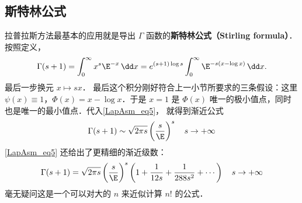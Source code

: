 \subsection{斯特林公式}
拉普拉斯方法最基本的应用就是导出 $\Gamma$ 函数的\textbf{斯特林公式（Stirling formula）}． 按照定义，
\[
  \Gamma(s+1)
  =\int_0^\infty x^s\E^{-x}\,\dd x
  =e^{(s+1)\log s}\int_0^\infty \E^{-s(x-\log x)}\,\dd x.
\]
最后一步换元 $x\mapsto sx$． 最后这个积分刚好符合上一小节所要求的三条假设：这里 $\psi(x)\equiv1$，$\Phi(x)=x-\log x$．于是 $x=1$ 是 $\Phi(x)$ 唯一的极小值点，同时也是唯一的最小值点．代入\autoref{LapAsm_eq5}， 就得到渐近公式
\[
  \Gamma(s+1)\sim\sqrt{2\pi s}\left(\frac{s}{\E}\right)^s\quad s\to+\infty
\]
\autoref{LapAsm_eq5} 还给出了更精细的渐近级数：
\[
  \Gamma(s+1)
  =\sqrt{2\pi s}\left({s\over \E}\right)^s
  \left(
   1+{1\over12s}+{1\over288 s^2}+ \cdots
  \right)\quad s\to+\infty
\]
毫无疑问这是一个可以对大的 $n$ 来近似计算 $n!$ 的公式．
